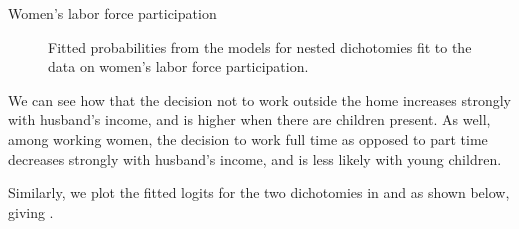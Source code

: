 \documentclass[11pt]{book}
\renewenvironment{knitrout}{\small\renewcommand{\baselinestretch}{.85}}{} %
\begin{document}
\begin{Example}[wlfpart1]{Women's labor force participation}
\begin{knitrout}
\begin{figure}[!htbp]
\caption[Fitted probabilities from the models for nested dichotomies fit to the data on women's labor force participation]{Fitted probabilities from the models for nested dichotomies fit to the data on women's labor force participation.\label{fig:wlf-fitted-prob}}
\end{figure}


\end{knitrout}
We can see how that the decision not to work outside the home
increases strongly with husband's income, and is higher when
there are children present. As well, among working women,
the decision to work full time as opposed to part time decreases
strongly with husband's income, and is less likely with young children.

Similarly, we plot the fitted logits for the two dichotomies
in  and  as shown below,
giving .  

\begin{knitrout}
\color{fgcolor}\begin{kframe}
\begin{alltt}
 \hlkwb{<-} \hlstd{(}\hlstd{=}\hlstd{(}\hlstd{,}\hlstd{),} \hlstd{=}\hlstd{(}\hlstd{,}\hlstd{,}\hlstd{,}\hlstd{)}\hlopt{+}\hlstd{)}
   \hlstd{(}\hlstd{,} \hlstd{) ) \{}
   \hlkwb{<-} \hlopt{==}
  \hlstd{(}  \hlstd{(}\hlopt{-}\hlstd{,}\hlstd{),} \hlstd{=}\hlstd{,} \hlstd{=}\hlstd{,}
        \hlstd{=}\hlstd{,} \hlstd{=}\hlstd{)}
  \hlopt{$}  \hlstd{=}\hlstd{,} \hlstd{=}\hlstd{,} \hlstd{=}\hlstd{)}
  \hlopt{$} \hlstd{=}\hlstd{,} \hlstd{=}\hlstd{,}  \hlstd{=}\hlstd{)}
  \hlstd{(}\hlstd{,} \hlstd{,} \hlstd{(} \hlstd{=}\hlstd{)}
   \hlopt{==}\hlstd{) \{}
    \hlstd{(}\hlstd{,} \hlstd{=}\hlopt{:}\hlstd{,} \hlstd{=}\hlstd{,} \hlstd{=}\hlstd{(}\hlstd{,} \hlstd{),}
           \hlstd{=}\hlstd{(}\hlstd{,} \hlstd{))}
    \hlstd{\}}
\hlstd{\}}
\end{alltt}
\end{kframe}\begin{figure}[!htbp]



\end{figure}
\end{knitrout}
\end{Example}
\end{document}

